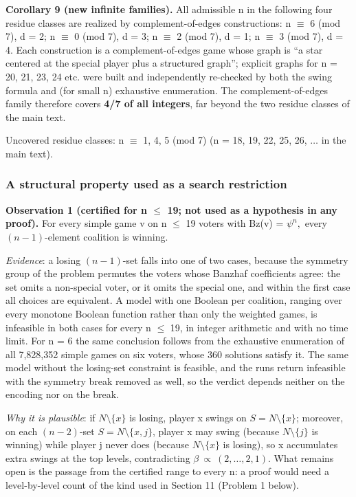 \documentclass[
]{article}
\begin{document}
\textbf{Corollary 9 (new infinite families).} All admissible n in the
following four residue classes are realized by complement-of-edges
constructions: n \(\equiv\) 6 (mod 7), d = 2; n \(\equiv\) 0 (mod 7), d
= 3; n \(\equiv\) 2 (mod 7), d = 1; n \(\equiv\) 3 (mod 7), d = 4. Each
construction is a complement-of-edges game whose graph is ``a star
centered at the special player plus a structured graph''; explicit
graphs for n = 20, 21, 23, 24 etc. were built and independently
re-checked by both the swing formula and (for small n) exhaustive
enumeration. The complement-of-edges family therefore covers \textbf{4/7
of all integers}, far beyond the two residue classes of the main text.

Uncovered residue classes: n \(\equiv\) 1, 4, 5 (mod 7) (n = 18, 19, 22,
25, 26, \(\dots\) in the main text).

\subsubsection{A structural property used as a search
restriction}\label{a-structural-property-used-as-a-search-restriction}

\textbf{Observation 1 (certified for n \(\le\) 19; not used as a
hypothesis in any proof).} For every simple game v on n \(\le\) 19
voters with Bz(v) = \(\psi^n,\) every \((n-1)\)-element coalition is
winning.

\emph{Evidence}: a losing \((n-1)\)-set falls into one of two cases,
because the symmetry group of the problem permutes the voters whose
Banzhaf coefficients agree: the set omits a non-special voter, or it
omits the special one, and within the first case all choices are
equivalent. A model with one Boolean per coalition, ranging over every
monotone Boolean function rather than only the weighted games, is
infeasible in both cases for every n \(\le\) 19, in integer arithmetic
and with no time limit. For n = 6 the same conclusion follows from the
exhaustive enumeration of all 7,828,352 simple games on six voters,
whose 360 solutions satisfy it. The same model without the losing-set
constraint is feasible, and the runs return infeasible with the symmetry
break removed as well, so the verdict depends neither on the encoding
nor on the break.

\emph{Why it is plausible}: if \(N\setminus\{x\}\) is losing, player x
swings on \(S = N\setminus\{x\}\); moreover, on each \((n-2)\)-set
\(S = N\setminus\{x,j\}\), player x may swing (because
\(N\setminus\{j\}\) is winning) while player j never does (because
\(N\setminus\{x\}\) is losing), so x accumulates extra swings at the top
levels, contradicting \(\beta\ \propto\ (2,\dots,2,1).\) What remains
open is the passage from the certified range to every n: a proof would
need a level-by-level count of the kind used in Section 11 (Problem 1
below).
\end{document}
